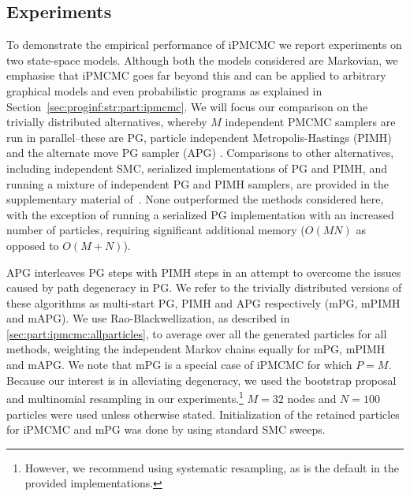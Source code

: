 
\subsection{Experiments}
\label{sec:experiments}

To demonstrate the %
empirical performance of iPMCMC we report experiments on two state-space models.  
Although both the models considered are Markovian, we emphasise that iPMCMC goes far beyond this and can be applied to arbitrary graphical models
and even probabilistic programs as explained in Section~\ref{sec:proginf:str:part:ipmcmc}. 
We will focus our comparison on the trivially distributed alternatives, whereby $M$ independent PMCMC samplers are run in parallel--these are PG, particle independent Metropolis-Hastings (PIMH) \citep{andrieu2010particle} and the alternate move PG sampler (APG) \citep{holenstein2009particle}. Comparisons to other alternatives, including independent SMC, serialized implementations of PG and PIMH, and running a mixture of independent PG and PIMH samplers, are provided in the supplementary material of~\cite{rainforth2016interacting}.  
None outperformed the methods considered here, with the exception of running a serialized PG implementation with an increased number of particles, requiring significant additional memory ($O(MN)$ as opposed to $O(M+N)$).

APG interleaves PG steps with PIMH steps
in an attempt to overcome the issues caused by path degeneracy in PG.  We refer to the trivially distributed versions of these algorithms as multi-start PG, PIMH and APG respectively (mPG, mPIMH and mAPG). 
We use Rao-Blackwellization, as described in \ref{sec:part:ipmcmc:allparticles}, to average over all the generated particles for all methods, weighting the independent Markov chains equally for mPG, mPIMH and mAPG. We note that mPG is a special case of iPMCMC for which $P=M$.  Because our interest is in alleviating degeneracy, we used the bootstrap proposal and multinomial resampling in our experiments.\footnote{However, we recommend
	using systematic resampling, as is the default in the provided implementations.}
 $M=32$ nodes and $N=100$ particles were used unless otherwise stated.  Initialization of the retained particles for iPMCMC and mPG was done by using standard SMC sweeps.

